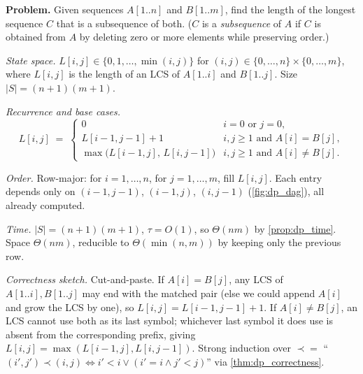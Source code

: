 \begin{example}
\label{ex:lcs}
\textbf{Problem.} Given sequences $A[1..n]$ and $B[1..m]$, find the length of the longest sequence $C$ that is a subsequence of both. ($C$ is a \emph{subsequence} of $A$ if $C$ is obtained from $A$ by deleting zero or more elements while preserving order.)

\medskip
\noindent\textit{State space.} $L[i, j] \in \{0, 1, \dots, \min(i, j)\}$ for $(i, j) \in \{0, \dots, n\} \times \{0, \dots, m\}$, where $L[i, j]$ is the length of an LCS of $A[1..i]$ and $B[1..j]$. Size $|S| = (n+1)(m+1)$.

\medskip
\noindent\textit{Recurrence and base cases.}
\[
  L[i, j] \;=\; \begin{cases}
    0 & i = 0 \text{ or } j = 0, \\
    L[i-1, j-1] + 1 & i, j \ge 1 \text{ and } A[i] = B[j], \\
    \max\bigl(L[i-1, j],\, L[i, j-1]\bigr) & i, j \ge 1 \text{ and } A[i] \ne B[j].
  \end{cases}
\]

\medskip
\noindent\textit{Order.} Row-major: for $i = 1, \dots, n$, for $j = 1, \dots, m$, fill $L[i, j]$. Each entry depends only on $(i-1, j-1)$, $(i-1, j)$, $(i, j-1)$ (\cref{fig:dp_dag}), all already computed.

\medskip
\noindent\textit{Time.} $|S| = (n+1)(m+1)$, $\tau = O(1)$, so $\Theta(nm)$ by \cref{prop:dp_time}. Space $\Theta(nm)$, reducible to $\Theta(\min(n, m))$ by keeping only the previous row.

\medskip
\noindent\textit{Correctness sketch.} Cut-and-paste. If $A[i] = B[j]$, any LCS of $A[1..i], B[1..j]$ may end with the matched pair (else we could append $A[i]$ and grow the LCS by one), so $L[i, j] = L[i-1, j-1] + 1$. If $A[i] \ne B[j]$, an LCS cannot use both as its last symbol; whichever last symbol it does use is absent from the corresponding prefix, giving $L[i, j] = \max(L[i-1, j], L[i, j-1])$. Strong induction over $\prec = $ ``$(i', j') \prec (i, j) \iff i' < i \vee (i' = i \wedge j' < j)$'' via \cref{thm:dp_correctness}.
\end{example}

